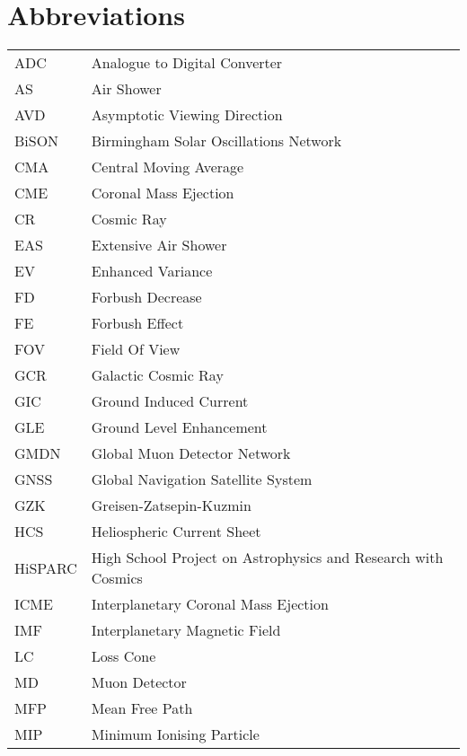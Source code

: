 \chapter*{Abbreviations}
\thispagestyle{plain}

\begin{tabular}{l l}
	{ADC} & {Analogue to Digital Converter} \\
	{AS}		&	{Air Shower}	\\	
	{AVD}  & {Asymptotic Viewing Direction} \\
	{BiSON}  & {Birmingham Solar Oscillations Network} \\
	{CMA} & {Central Moving Average} \\
	{CME}	&	{Coronal Mass Ejection}	\\
	{CR}	&	{Cosmic Ray}	\\		
	{EAS}  &  {Extensive Air Shower} \\
	{EV}		&	{Enhanced Variance}	\\
	{FD}		&	{Forbush Decrease}	\\
	{FE}		&	{Forbush Effect}	\\
	{FOV}	&	{Field Of View}	\\
	{GCR}	&	{Galactic Cosmic Ray}	\\
	{GIC}   &  {Ground Induced Current} \\ 
	{GLE}	&	{Ground Level Enhancement}	\\
	{GMDN}	&	{Global Muon Detector Network}	\\
	{GNSS} & {Global Navigation Satellite System} \\
	{GZK}  &  {Greisen-Zatsepin-Kuzmin} \\
	{HCS}	&	{Heliospheric Current Sheet}	\\
	{HiSPARC} & {High School Project on Astrophysics and Research with Cosmics} \\
	{ICME}	&	{Interplanetary Coronal Mass Ejection}	\\
	{IMF	}	&	{Interplanetary Magnetic Field}	\\
	{LC}		&	{Loss Cone}	\\		
	{MD}  & {Muon Detector} \\
	{MFP}	&	{Mean Free Path}	\\																
	{MIP} & {Minimum Ionising Particle} \\

\end{tabular}
